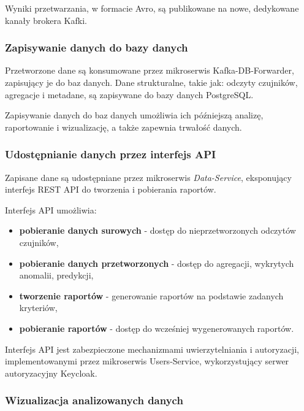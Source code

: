 \vspace{0.3em}

Wyniki przetwarzania, w formacie Avro, są publikowane na nowe, dedykowane kanały brokera Kafki.

\subsubsection{Zapisywanie danych do bazy danych}
\label{subsubsec:zapisywanie_danych}

Przetworzone dane są konsumowane przez mikroserwis Kafka-DB-Forwarder, zapisujący je do baz danych. Dane strukturalne, takie jak: odczyty czujników,
agregacje i metadane, są zapisywane do bazy danych PostgreSQL.

Zapisywanie danych do baz danych umożliwia ich późniejszą analizę, raportowanie i wizualizację, a także zapewnia trwałość danych.

\subsubsection{Udostępnianie danych przez interfejs API}
\label{subsubsec:udostepnianie_danych}

Zapisane dane są udostępniane przez mikroserwis \textit{\mbox{Data-Service}}, eksponujący interfejs REST API do tworzenia i pobierania raportów. 

\vspace{0.3em}

Interfejs API umożliwia:

\begin{itemize}
    \item \textbf{pobieranie danych surowych} - dostęp do nieprzetworzonych odczytów czujników,
    \item \textbf{pobieranie danych przetworzonych} - dostęp do agregacji, wykrytych anomalii, predykcji,
    \item \textbf{tworzenie raportów} - generowanie raportów na podstawie zadanych kryteriów,
    \item \textbf{pobieranie raportów} - dostęp do wcześniej wygenerowanych raportów.
\end{itemize}

\vspace{0.3em}

Interfejs API jest zabezpieczone mechanizmami uwierzytelniania i autoryzacji, implementowanymi przez mikroserwis Users-Service, wykorzystujący serwer autoryzacyjny Keycloak.

\subsubsection{Wizualizacja analizowanych danych}
\label{subsubsec:wizualizacja_danych}

